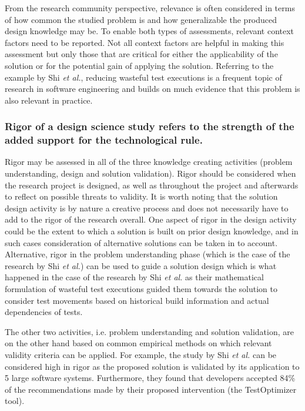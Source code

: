 \documentclass[graybox]{svmult}
\begin{document}
From the research community perspective, relevance is often considered in terms of how common the studied problem is and how generalizable the produced design knowledge may be. To enable both types of assessments, relevant context factors need to be reported. Not all context factors are helpful in making this assessment but only those that are critical for either the applicability of the solution or for the potential gain of applying the solution. 
Referring to the example by Shi \emph{et al.}, reducing wasteful test executions is a frequent topic of research in software engineering and builds on much evidence that this problem is also relevant in practice.

\subsubsection{Rigor of a design science study refers to the strength of the added support for the technological rule.} Rigor may be assessed in all of the three knowledge creating activities (problem understanding, design and solution validation). 
Rigor should be considered when the research project is designed, as well as throughout the project and afterwards to reflect on possible threats to validity. 
It is worth noting that the solution design activity is by nature a creative process and does not necessarily have to add to the rigor of the research overall. One aspect of rigor in the design activity could be the extent to which a solution is built on prior design knowledge, and in such cases consideration of alternative solutions can be taken in to account. 
Alternative, rigor in the problem understanding phase (which is the case of the research by Shi \emph{et al.}) can be used to guide a solution design which is what happened in the case of the research by Shi \emph{et al.} as their mathematical formulation of wasteful test executions guided them towards the solution to consider test movements based on historical build information and actual dependencies of tests. 

The other two activities, i.e. problem understanding and solution validation, are on the other hand based on common empirical methods on which relevant validity criteria can be applied. For example, the study by Shi \emph{et al.} can be considered high in rigor as the proposed solution is validated by its application to 5 large software systems.  Furthermore, they found that developers accepted 84\% of the recommendations made by their proposed intervention (the TestOptimizer tool). 
\end{document}
